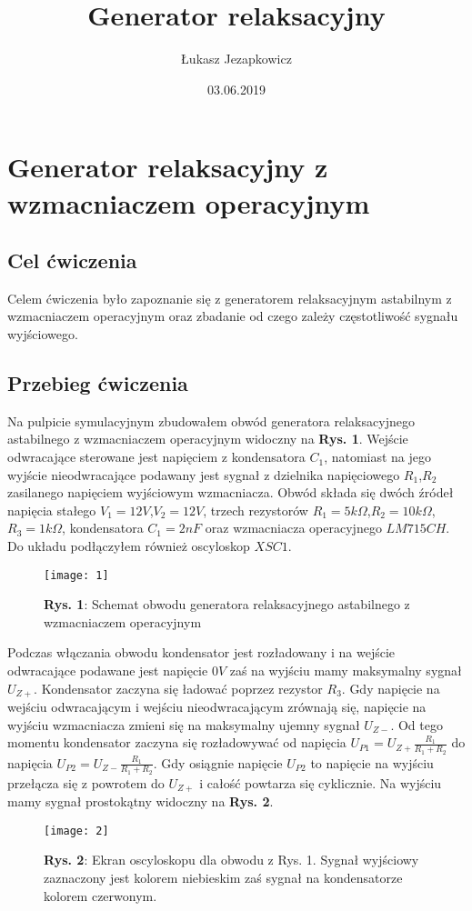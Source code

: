 \documentclass[12pt]{article}
\author{Łukasz Jezapkowicz}
\title{Generator relaksacyjny}
\date{03.06.2019}
\begin{document}
\maketitle
\tableofcontents \newpage
\section{Generator relaksacyjny z wzmacniaczem operacyjnym}
\subsection{Cel ćwiczenia}
Celem ćwiczenia było zapoznanie się z generatorem relaksacyjnym astabilnym z wzmacniaczem operacyjnym oraz zbadanie od czego zależy częstotliwość sygnału wyjściowego.
\subsection{Przebieg ćwiczenia}
Na pulpicie symulacyjnym zbudowałem obwód generatora relaksacyjnego astabilnego z wzmacniaczem operacyjnym widoczny na \textbf{Rys. 1}. Wejście odwracające sterowane jest napięciem z kondensatora $C_1$, natomiast na jego wyjście nieodwracające podawany jest sygnał z dzielnika napięciowego $R_1$,$R_2$ zasilanego napięciem wyjściowym wzmacniacza. Obwód składa się dwóch źródeł napięcia stałego $V_1=12V$,$V_2=12V$, trzech rezystorów $R_1=5k\Omega$,$R_2=10k\Omega$,$R_3=1k\Omega$, kondensatora $C_1=2nF$ oraz wzmacniacza operacyjnego $LM715CH$. Do układu podłączyłem również oscyloskop $XSC1$.
\begin{figure}[H]
\centering
\texttt{[image: 1]}
\caption*{\textbf{Rys. 1}: Schemat obwodu generatora relaksacyjnego astabilnego z wzmacniaczem operacyjnym }
\end{figure}
\noindent Podczas włączania obwodu kondensator jest rozładowany i na wejście odwracające podawane jest napięcie $0V$ zaś na wyjściu mamy maksymalny sygnał $U_{Z+}$. Kondensator zaczyna się ładować poprzez rezystor $R_3$. Gdy napięcie na wejściu odwracającym i wejściu nieodwracającym zrównają się, napięcie
na wyjściu wzmacniacza zmieni się na maksymalny ujemny sygnał $U_{Z-}$. Od tego momentu kondensator zaczyna się rozładowywać od napięcia $U_{P1}=U_{Z+}\frac{R_1}{R_1+R_2}$ do napięcia $U_{P2}=U_{Z-}\frac{R_1}{R_1+R_2}$. Gdy osiągnie napięcie $U_{P2}$ to napięcie na wyjściu przełącza się z powrotem do
$U_{Z+}$ i całość powtarza się cyklicznie. Na wyjściu mamy sygnał prostokątny widoczny na \textbf{Rys. 2}.
\begin{figure}[H]
\centering
\texttt{[image: 2]}
\caption*{\textbf{Rys. 2}: Ekran oscyloskopu dla obwodu z Rys. 1. Sygnał wyjściowy zaznaczony jest kolorem niebieskim zaś sygnał na kondensatorze kolorem czerwonym. }
\end{figure}
\end{document}
